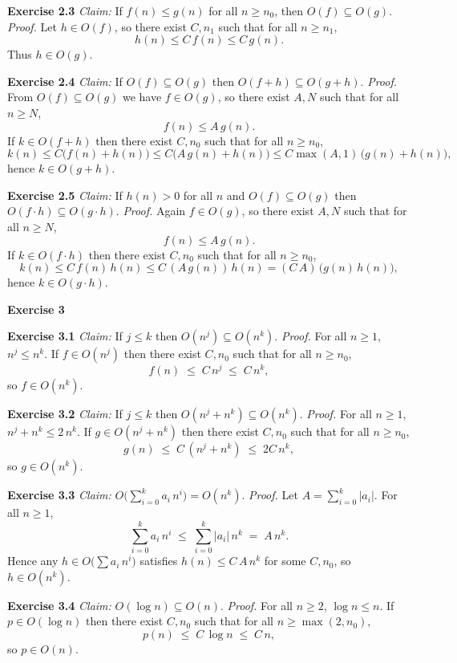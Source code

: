 \documentclass{article}
\theoremstyle{theorem}
\theoremstyle{definition}
\theoremstyle{remark}
\begin{document}
\textbf{Exercise 2.3}  
\emph{Claim:} If $f(n)\le g(n)$ for all $n\ge n_0$, then $O(f)\subseteq O(g)$.  
\noindent\emph{Proof.}  
Let $h\in O(f)$, so there exist $C,n_1$ such that for all $n\ge n_1$,
\[
  h(n)\le C\,f(n)\le C\,g(n).
\]
Thus $h\in O(g)$.

\textbf{Exercise 2.4}  
\emph{Claim:} If $O(f)\subseteq O(g)$ then $O(f+h)\subseteq O(g+h)$.  
\noindent\emph{Proof.}  
From $O(f)\subseteq O(g)$ we have $f\in O(g)$, so there exist $A,N$ such that for all $n\ge N$,
\[
  f(n)\le A\,g(n).
\]
If $k\in O(f+h)$ then there exist $C,n_0$ such that for all $n\ge n_0$,
\[
  k(n)\le C\bigl(f(n)+h(n)\bigr)
  \le C\bigl(A\,g(n)+h(n)\bigr)
  \le C\max(A,1)\,\bigl(g(n)+h(n)\bigr),
\]
hence $k\in O(g+h)$.

\textbf{Exercise 2.5}  
\emph{Claim:} If $h(n)>0$ for all $n$ and $O(f)\subseteq O(g)$ then $O(f\cdot h)\subseteq O(g\cdot h)$.  
\noindent\emph{Proof.}  
Again $f\in O(g)$, so there exist $A,N$ such that for all $n\ge N$,
\[
  f(n)\le A\,g(n).
\]
If $k\in O(f\cdot h)$ then there exist $C,n_0$ such that for all $n\ge n_0$,
\[
  k(n)\le C\,f(n)\,h(n)
  \le C\,(A\,g(n))\,h(n)
  =(C\,A)\,\bigl(g(n)\,h(n)\bigr),
\]
hence $k\in O(g\cdot h)$.

\textbf{Exercise 3}

\textbf{Exercise 3.1}  
\emph{Claim:} If $j\le k$ then $O(n^j)\subseteq O(n^k)$.  
\noindent\emph{Proof.}  
For all $n\ge1$, $n^j\le n^k$. If $f\in O(n^j)$ then there exist $C,n_0$ such that for all $n\ge n_0$,
\[
  f(n)\;\le\;C\,n^j\;\le\;C\,n^k,
\]
so $f\in O(n^k)$.

\textbf{Exercise 3.2}  
\emph{Claim:} If $j\le k$ then $O(n^j + n^k)\subseteq O(n^k)$.  
\noindent\emph{Proof.}  
For all $n\ge1$, $n^j + n^k \le 2\,n^k$. If $g\in O(n^j + n^k)$ then there exist $C,n_0$ such that for all $n\ge n_0$,
\[
  g(n)\;\le\;C\,(n^j + n^k)\;\le\;2C\,n^k,
\]
so $g\in O(n^k)$.

\textbf{Exercise 3.3}  
\emph{Claim:} $O\bigl(\sum_{i=0}^k a_i\,n^i\bigr)=O(n^k)$.  
\noindent\emph{Proof.}  
Let $A=\sum_{i=0}^k|a_i|$. For all $n\ge1$,
\[
  \sum_{i=0}^k a_i\,n^i
  \;\le\;
  \sum_{i=0}^k |a_i|\,n^k
  \;=\;
  A\,n^k.
\]
Hence any $h\in O\bigl(\sum a_i\,n^i\bigr)$ satisfies $h(n)\le C\,A\,n^k$ for some $C,n_0$, so $h\in O(n^k)$.

\textbf{Exercise 3.4}  
\emph{Claim:} $O(\log n)\subseteq O(n)$.  
\noindent\emph{Proof.}  
For all $n\ge2$, $\log n\le n$. If $p\in O(\log n)$ then there exist $C,n_0$ such that for all $n\ge\max(2,n_0)$,
\[
  p(n)\;\le\;C\,\log n\;\le\;C\,n,
\]
so $p\in O(n)$.
\end{document}
